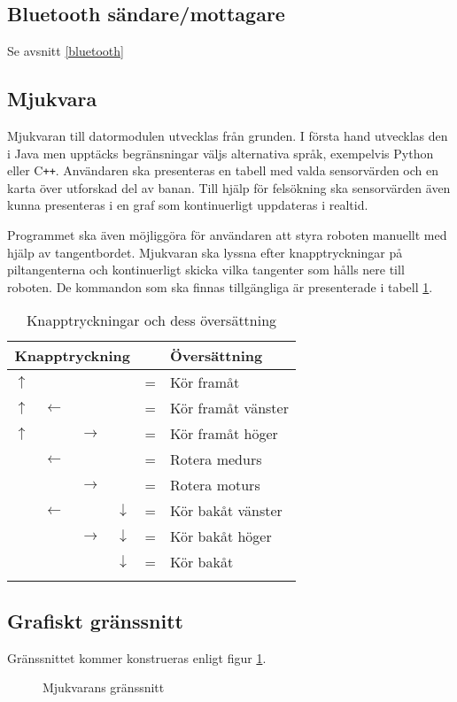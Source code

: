 \documentclass[11pt]{article}
\begin{document}
\begin{flushleft}
\subsection{Bluetooth\textsuperscript{\circledR} sändare/mottagare}
Se avsnitt \ref{bluetooth}
\subsection{Mjukvara}
Mjukvaran till datormodulen utvecklas från grunden. I första hand utvecklas den i Java men upptäcks begränsningar väljs alternativa språk, exempelvis Python eller C\texttt{++}. Användaren ska presenteras en tabell med valda sensorvärden och en karta över utforskad del av banan. Till hjälp för felsökning ska sensorvärden även kunna presenteras i en graf som kontinuerligt uppdateras i realtid. 

Programmet ska även möjliggöra för användaren att styra roboten manuellt med hjälp av tangentbordet. Mjukvaran ska lyssna efter knapptryckningar på piltangenterna och kontinuerligt skicka vilka tangenter som hålls nere till roboten. De kommandon som ska finnas tillgängliga är presenterade i tabell \ref{commands}.

\begin{longtable}{|p{.05\linewidth} p{.05\linewidth} p{.05\linewidth} p{.05\linewidth} c l|}
	\multicolumn{4}{c}{\textbf{Knapptryckning}} & & \multicolumn{1}{l}{\textbf{Översättning}} \\ \hline\hline
	$\uparrow$ &  				&  				& 				& = & Kör framåt \\ \hline
	$\uparrow$ & $\leftarrow$	&				&				& = & Kör framåt vänster \\ \hline
	$\uparrow$ &				& $\rightarrow$	&				& = & Kör framåt höger \\ \hline
			   & $\leftarrow$	&				&				& = & Rotera medurs \\ \hline
			   &				& $\rightarrow$	&				& = & Rotera moturs \\ \hline
			   & $\leftarrow$	&				& $\downarrow$	& = & Kör bakåt vänster \\ \hline
			   &				& $\rightarrow$ & $\downarrow$	& = & Kör bakåt höger \\ \hline
			   &				&				& $\downarrow$	& = & Kör bakåt \\ \hline
	\caption{Knapptryckningar och dess översättning} \label{commands}
\end{longtable}

\subsection{Grafiskt gränssnitt}
Gränssnittet kommer konstrueras enligt figur \ref{software}.
\begin{figure}[htbp]
\centering
\noindent\resizebox{.8\textwidth}{!}{
		}
	\caption{Mjukvarans gränssnitt \label{software}}
\end{figure}


\end{flushleft}
\end{document}
